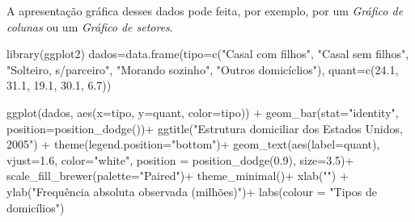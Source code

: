 \documentclass[
]{book}
\newenvironment{Shaded}{\begin{snugshade}}{\end{snugshade}}
\newcommand{\AttributeTok}[1]{\textcolor[rgb]{0.77,0.63,0.00}{#1}}
\newcommand{\FloatTok}[1]{\textcolor[rgb]{0.00,0.00,0.81}{#1}}
\newcommand{\FunctionTok}[1]{\textcolor[rgb]{0.00,0.00,0.00}{#1}}
\newcommand{\NormalTok}[1]{#1}
\newcommand{\OtherTok}[1]{\textcolor[rgb]{0.56,0.35,0.01}{#1}}
\newcommand{\SpecialCharTok}[1]{\textcolor[rgb]{0.00,0.00,0.00}{#1}}
\newcommand{\StringTok}[1]{\textcolor[rgb]{0.31,0.60,0.02}{#1}}
\begin{document}
A apresentação gráfica desses dados pode feita, por exemplo, por um \emph{Gráfico de colunas} ou um \emph{Gráfico de setores}.

\hfill\break

\begin{Shaded}
\begin{Highlighting}[]
\FunctionTok{library}\NormalTok{(ggplot2)}
\NormalTok{dados}\OtherTok{=}\FunctionTok{data.frame}\NormalTok{(}\AttributeTok{tipo=}\FunctionTok{c}\NormalTok{(}\StringTok{"Casal com filhos"}\NormalTok{,}
                          \StringTok{"Casal sem filhos"}\NormalTok{,}
                          \StringTok{"Solteiro, s/parceiro"}\NormalTok{,}
                          \StringTok{"Morando sozinho"}\NormalTok{,}
                          \StringTok{"Outros domicíclios"}\NormalTok{),}
                 \AttributeTok{quant=}\FunctionTok{c}\NormalTok{(}\FloatTok{24.1}\NormalTok{, }\FloatTok{31.1}\NormalTok{, }
                       \FloatTok{19.1}\NormalTok{, }\FloatTok{30.1}\NormalTok{,}
                       \FloatTok{6.7}\NormalTok{))}

\FunctionTok{ggplot}\NormalTok{(dados, }\FunctionTok{aes}\NormalTok{(}\AttributeTok{x=}\NormalTok{tipo, }\AttributeTok{y=}\NormalTok{quant, }\AttributeTok{color=}\NormalTok{tipo)) }\SpecialCharTok{+}
\FunctionTok{geom\_bar}\NormalTok{(}\AttributeTok{stat=}\StringTok{"identity"}\NormalTok{, }\AttributeTok{position=}\FunctionTok{position\_dodge}\NormalTok{())}\SpecialCharTok{+}
\FunctionTok{ggtitle}\NormalTok{(}\StringTok{"Estrutura domiciliar dos Estados Unidos, 2005"}\NormalTok{) }\SpecialCharTok{+}
\FunctionTok{theme}\NormalTok{(}\AttributeTok{legend.position=}\StringTok{"bottom"}\NormalTok{)}\SpecialCharTok{+}
\FunctionTok{geom\_text}\NormalTok{(}\FunctionTok{aes}\NormalTok{(}\AttributeTok{label=}\NormalTok{quant), }\AttributeTok{vjust=}\FloatTok{1.6}\NormalTok{, }\AttributeTok{color=}\StringTok{"white"}\NormalTok{, }\AttributeTok{position =} \FunctionTok{position\_dodge}\NormalTok{(}\FloatTok{0.9}\NormalTok{), }\AttributeTok{size=}\FloatTok{3.5}\NormalTok{)}\SpecialCharTok{+}
\FunctionTok{scale\_fill\_brewer}\NormalTok{(}\AttributeTok{palette=}\StringTok{"Paired"}\NormalTok{)}\SpecialCharTok{+}
\FunctionTok{theme\_minimal}\NormalTok{()}\SpecialCharTok{+}
\FunctionTok{xlab}\NormalTok{(}\StringTok{""}\NormalTok{)  }\SpecialCharTok{+}
\FunctionTok{ylab}\NormalTok{(}\StringTok{"Frequência absoluta observada (milhões)"}\NormalTok{)}\SpecialCharTok{+}
\FunctionTok{labs}\NormalTok{(}\AttributeTok{colour =} \StringTok{"Tipos de domicílios"}\NormalTok{) }
\end{Highlighting}
\end{Shaded}
\end{document}
